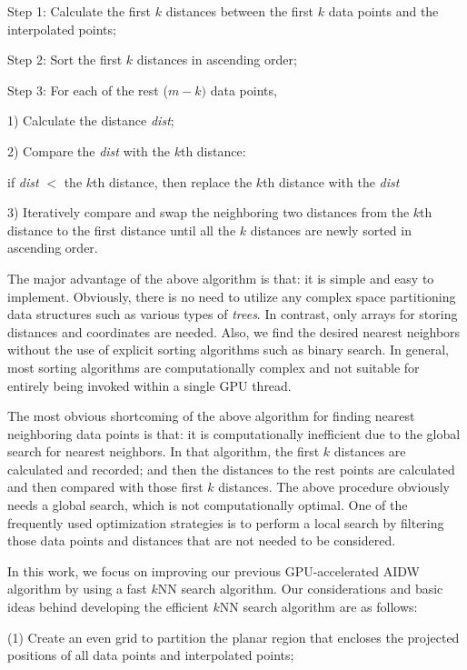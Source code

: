 \documentclass[final,5p,times,twocolumn,authoryear]{elsarticle}
\begin{document}
			Step 1: Calculate the first $k$ distances between the first $k$ data points and 
			the interpolated points; 
			
			Step 2: Sort the first $k$ distances in ascending order; 
			
			Step 3: For each of the rest ($m-k)$ data points, 
			
			1) Calculate the distance \textit{dist};
			
			2) Compare the \textit{dist} with the $k$th distance:
			
			if \textit{dist} $<$ the $k$th distance, then replace the $k$th distance with the \textit{dist}
			
			3) Iteratively compare and swap the neighboring two distances from the $k$th 
			distance to the first distance until all the $k$ distances are newly sorted in 
			ascending order.
			
			The major advantage of the above algorithm is that: it is simple and easy to 
			implement. Obviously, there is no need to utilize any complex space 
			partitioning data structures such as various types of \textit{trees}. In contrast, only 
			arrays for storing distances and coordinates are needed. Also, we find the 
			desired nearest neighbors without the use of explicit sorting algorithms 
			such as binary search. In general, most sorting algorithms are 
			computationally complex and not suitable for entirely being invoked within a 
			single GPU thread. 
			
			The most obvious shortcoming of the above algorithm for finding nearest 
			neighboring data points is that: it is computationally inefficient due to 
			the global search for nearest neighbors. In that algorithm, the first $k$ 
			distances are calculated and recorded; and then the distances to the rest 
			points are calculated and then compared with those first $k$ distances. The 
			above procedure obviously needs a global search, which is not 
			computationally optimal. One of the frequently used optimization strategies 
			is to perform a local search by filtering those data points and distances 
			that are not needed to be considered. 
			
			In this work, we focus on improving our previous GPU-accelerated AIDW 
			algorithm by using a fast $k$NN search algorithm. Our considerations and basic 
			ideas behind developing the efficient $k$NN search algorithm are as follows: 
			
			(1) Create an even grid to partition the planar region that encloses the 
			projected positions of all data points and interpolated points;
			
\end{document}
